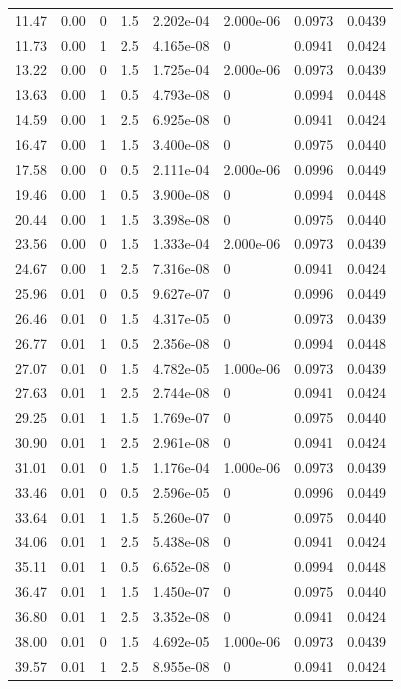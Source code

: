 \documentclass[preview]{standalone}
\begin{document}
{{\begin{tabular}{L{1.2cm}C{1.2cm} C{0.3cm}C{0.5cm} C{1.4cm}C{1.4cm} C{1.4cm}C{1.4cm}}
  11.47  &  0.00  & 0     & 1.5 &  2.202e-04  & 2.000e-06  & 0.0973 &  0.0439   \\ 
  11.73  &  0.00  & 1     & 2.5 &  4.165e-08  & 0  & 0.0941 &  0.0424   \\ 
  13.22  &  0.00  & 0     & 1.5 &  1.725e-04  & 2.000e-06  & 0.0973 &  0.0439   \\ 
  13.63  &  0.00  & 1     & 0.5 &  4.793e-08  & 0  & 0.0994 &  0.0448   \\ 
  14.59  &  0.00  & 1     & 2.5 &  6.925e-08  & 0  & 0.0941 &  0.0424   \\ 
  16.47  &  0.00  & 1     & 1.5 &  3.400e-08  & 0  & 0.0975 &  0.0440   \\ 
  17.58  &  0.00  & 0     & 0.5 &  2.111e-04  & 2.000e-06  & 0.0996 &  0.0449   \\ 
  19.46  &  0.00  & 1     & 0.5 &  3.900e-08  & 0  & 0.0994 &  0.0448   \\ 
  20.44  &  0.00  & 1     & 1.5 &  3.398e-08  & 0  & 0.0975 &  0.0440   \\ 
  23.56  &  0.00  & 0     & 1.5 &  1.333e-04  & 2.000e-06  & 0.0973 &  0.0439   \\ 
  24.67  &  0.00  & 1     & 2.5 &  7.316e-08  & 0  & 0.0941 &  0.0424   \\ 
  25.96  &  0.01  & 0     & 0.5 &  9.627e-07  & 0  & 0.0996 &  0.0449   \\ 
  26.46  &  0.01  & 0     & 1.5 &  4.317e-05  & 0  & 0.0973 &  0.0439   \\ 
  26.77  &  0.01  & 1     & 0.5 &  2.356e-08  & 0  & 0.0994 &  0.0448   \\ 
  27.07  &  0.01  & 0     & 1.5 &  4.782e-05  & 1.000e-06  & 0.0973 &  0.0439   \\ 
  27.63  &  0.01  & 1     & 2.5 &  2.744e-08  & 0  & 0.0941 &  0.0424   \\ 
  29.25  &  0.01  & 1     & 1.5 &  1.769e-07  & 0  & 0.0975 &  0.0440   \\ 
  30.90  &  0.01  & 1     & 2.5 &  2.961e-08  & 0  & 0.0941 &  0.0424   \\ 
  31.01  &  0.01  & 0     & 1.5 &  1.176e-04  & 1.000e-06  & 0.0973 &  0.0439   \\ 
  33.46  &  0.01  & 0     & 0.5 &  2.596e-05  & 0  & 0.0996 &  0.0449   \\ 
  33.64  &  0.01  & 1     & 1.5 &  5.260e-07  & 0  & 0.0975 &  0.0440   \\ 
  34.06  &  0.01  & 1     & 2.5 &  5.438e-08  & 0  & 0.0941 &  0.0424   \\ 
  35.11  &  0.01  & 1     & 0.5 &  6.652e-08  & 0  & 0.0994 &  0.0448   \\ 
  36.47  &  0.01  & 1     & 1.5 &  1.450e-07  & 0  & 0.0975 &  0.0440   \\ 
  36.80  &  0.01  & 1     & 2.5 &  3.352e-08  & 0  & 0.0941 &  0.0424   \\ 
  38.00  &  0.01  & 0     & 1.5 &  4.692e-05  & 1.000e-06  & 0.0973 &  0.0439   \\ 
  39.57  &  0.01  & 1     & 2.5 &  8.955e-08  & 0  & 0.0941 &  0.0424   \\ 
\hline 
\end{tabular} 

}}
\end{document}
